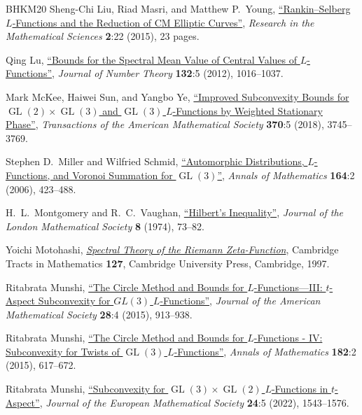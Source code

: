 \documentclass[11pt,a4paper]{amsart}
\DeclareMathOperator{\GL}{GL}
\numberwithin{equation}{section}
\theoremstyle{remark}
\theoremstyle{definition}
\begin{document}
\begin{thebibliography}{BHKM20}
 Sheng-Chi Liu, Riad Masri, and Matthew P.~Young, \href{https://doi.org/10.1186/s40687-015-0040-y}{``Rankin--Selberg $L$‑Functions and the Reduction of CM Elliptic Curves''}, \textit{Research in the Mathematical Sciences} \textbf{2}:22 (2015), 23 pages.

 Qing Lu, \href{https://doi.org/10.1016/j.jnt.2011.12.008}{``Bounds for the Spectral Mean Value of Central Values of $L$-Functions''}, \textit{Journal of Number Theory} \textbf{132}:5 (2012), 1016--1037.

 Mark McKee, Haiwei Sun, and Yangbo Ye, \href{https://doi.org/10.1090/tran/7159}{``Improved Subconvexity Bounds for $\GL(2) \times \GL(3)$ and $\GL(3)$ $L$-Functions by Weighted Stationary Phase''}, \textit{Transactions of the American Mathematical Society} \textbf{370}:5 (2018), 3745--3769.

 Stephen D.~Miller and Wilfried Schmid, \href{https://doi.org/10.4007/annals.2006.164.423}{``Automorphic Distributions, $L$-Functions, and Voronoi Summation for $\GL(3)$''}, \textit{Annals of Mathematics} \textbf{164}:2 (2006), 423--488.

 H.~L.~Montgomery and R.~C.~Vaughan, \href{https://doi.org/10.1112/jlms/s2-8.1.73}{``Hilbert's Inequality''}, \textit{Journal of the London Mathematical Society} \textbf{8} (1974), 73--82.

 Yoichi Motohashi, \href{https://doi.org/10.1017/CBO9780511983399}{\textit{Spectral Theory of the Riemann Zeta-Function}}, Cambridge Tracts in Mathematics \textbf{127}, Cambridge University Press, Cambridge, 1997.

 Ritabrata Munshi, \href{https://doi.org/10.1090/jams/843}{``The Circle Method and Bounds for $L$-Functions---III: $t$-Aspect Subconvexity for $GL(3)$ $L$-Functions''}, \textit{Journal of the American Mathematical Society} \textbf{28}:4 (2015), 913--938.

 Ritabrata Munshi, \href{https://doi.org/10.4007/annals.2015.182.2.6}{``The Circle Method and Bounds for $L$-Functions - IV: Subconvexity for Twists of $\GL(3)$ $L$-Functions''}, \textit{Annals of Mathematics} \textbf{182}:2 (2015), 617--672.

 Ritabrata Munshi, \href{https://doi.org/10.4171/jems/1131}{``Subconvexity for $\GL(3) \times \GL(2)$ $L$-Functions in $t$-Aspect''}, \textit{Journal of the European Mathematical Society} \textbf{24}:5 (2022), 1543--1576.


\end{thebibliography}
\end{document}
